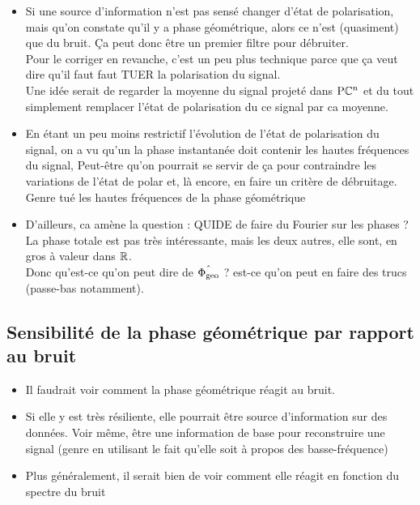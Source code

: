\begin{itemize}
	\item Si une source d'information n'est pas sensé changer d'état de polarisation, mais qu'on constate qu'il y a phase géométrique, alors ce n'est (quasiment) que du bruit. Ça peut donc être un premier filtre pour débruiter.
	\\
	
	Pour le corriger en revanche, c'est un peu plus technique parce que ça veut dire qu'il faut faut TUER la polarisation du signal.
	\\
	Une idée serait de regarder la moyenne du signal projeté dans $\text{\normalfont P}\mathbb{C}^{n}$ et du tout simplement remplacer l'état de polarisation du ce signal par ca moyenne.
	
	\item En étant un peu moins restrictif l'évolution de l'état de polarisation du signal, on a vu qu'un la phase instantanée doit contenir les hautes fréquences du signal, Peut-être qu'on pourrait se servir de ça pour contraindre les variations de l'état de polar et, là encore, en faire un critère de débruitage. Genre tué les hautes fréquences de la phase géométrique
	
	\item D'ailleurs, ca amène la question : QUIDE de faire du Fourier sur les phases ? La phase totale est pas très intéressante, mais les deux autres, elle sont, en gros à valeur dans $\mathbb{R}$.\\
	Donc qu'est-ce qu'on peut dire de $\hat{\Phi_{\text{\normalfont geo}}}$ ? est-ce qu'on peut en faire des trucs (passe-bas notamment).
	
\end{itemize}




\subsection{Sensibilité de la phase géométrique par rapport au bruit}

\begin{itemize}
	\item Il faudrait voir comment la phase géométrique réagit au bruit.
	
	\item Si elle y est très résiliente, elle pourrait être source d'information sur des données. Voir même, être une information de base pour reconstruire une signal (genre en utilisant le fait qu'elle soit à propos des basse-fréquence)
	
	\item Plus généralement, il serait bien de voir comment elle réagit en fonction du spectre du bruit
	
\end{itemize}




